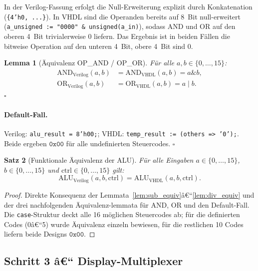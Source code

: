 ﻿\documentclass[12pt,a4paper]{report}
\newtheorem{theorem}{Satz}[section]
\newtheorem{lemma}[theorem]{Lemma}
\begin{document}
In der Verilog-Fassung erfolgt die Null-Erweiterung explizit durch
Konkatenation (\texttt{\{4'h0,~...\}}).  In VHDL sind die Operanden bereits
auf 8~Bit null-erweitert (\texttt{a\_unsigned := "0000" \& unsigned(a\_in)}),
sodass AND und OR auf den oberen 4~Bit trivialerweise 0 liefern.  Das Ergebnis
ist in beiden Fällen die bitweise Operation auf den unteren 4~Bit, obere
4~Bit sind 0.

\begin{lemma}[Äquivalenz OP\_AND / OP\_OR]
	Für alle $a, b \in \{0,\ldots,15\}$:
	\begin{align*}
		\mathrm{AND}_\mathrm{Verilog}(a,b) &= \mathrm{AND}_\mathrm{VHDL}(a,b) = a \mathbin{\&} b, \\
		\mathrm{OR}_\mathrm{Verilog}(a,b)  &= \mathrm{OR}_\mathrm{VHDL}(a,b)  = a \mathbin{|} b.
	\end{align*}
	\hfill $\square$
\end{lemma}

\paragraph{Default-Fall.}
Verilog: \texttt{alu\_result = 8'h00;}; VHDL: \texttt{temp\_result := (others => \newline'0');}.
Beide ergeben $\texttt{0x00}$ für alle undefinierten Steuercodes. \hfill $\square$

\begin{theorem}[Funktionale Äquivalenz der ALU]
	\label{thm:alu_equiv}
	Für alle Eingaben $a \in \{0,\ldots,15\}$, $b \in \{0,\ldots,15\}$ und
	$\mathrm{ctrl} \in \{0,\ldots,15\}$ gilt:
	\[
	\mathrm{ALU}_\mathrm{Verilog}(a, b, \mathrm{ctrl}) =
	\mathrm{ALU}_\mathrm{VHDL}(a, b, \mathrm{ctrl}).
	\]
\end{theorem}

\begin{proof}
	Direkte Konsequenz der Lemmata~\ref{lem:sub_equiv}â€“\ref{lem:div_equiv} und
	der drei nachfolgenden Äquivalenz-\newline lemmata für AND, OR und den Default-Fall.
	Die \texttt{case}-Struktur deckt alle 16 möglichen Steuercodes ab; für die
	definierten Codes (0â€“5) wurde Äquivalenz einzeln bewiesen, für die restlichen
	10 Codes liefern beide Designs $\texttt{0x00}$.
\end{proof}

\subsection{Schritt 3 â€“ Display-Multiplexer}
\label{sssec:display_mux}
\end{document}
